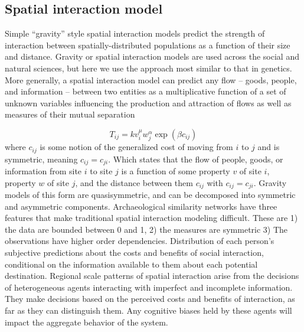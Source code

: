 \documentclass[11pt]{wlscirep}
\begin{document}
\subsection*{Spatial interaction model}
Simple ``gravity'' style spatial interaction models predict the strength of interaction between spatially-distributed populations as a function of their size and distance. Gravity or spatial interaction models are used across the social and natural sciences, but here we use the approach most similar to that in genetics. More generally, a spatial interaction model can predict any flow -- goods, people, and information -- between two entities as a multiplicative function of a set of unknown variables influencing the production and attraction of flows as well as measures of their mutual separation

\begin{equation}
    T_{ij} = k v_i^\mu w_j^\alpha \exp(\beta c_{ij})
\end{equation}
where $c_{ij}$ is some notion of the generalized cost of moving from $i$ to $j$ and is symmetric, meaning $c_{ij} = c_{ji}$. Which states that the flow of people, goods, or information from site $i$ to site $j$ is a function of some property $v$ of site $i$, property $w$ of site $j$, and the distance between them $c_{ij}$ with $c_{ij} = c_{ji}$. Gravity models of this form are quasisymmetric, and can be decomposed into symmetric and asymmetric components. 
Archaeological similarity networks have three features that make traditional spatial interaction modeling difficult. These are 1) the data are bounded between 0 and 1, 2) the measures are symmetric
3) The observations have higher order dependencies. Distribution of each person's subjective predictions about the costs and benefits of social interaction, conditional on the information available to them about each potential destination. Regional scale patterns of spatial interaction arise from the decisions of heterogeneous agents interacting with imperfect and incomplete information. They make decisions based on the perceived costs and benefits of interaction, as far as they can distinguish them. Any cognitive biases held by these agents will impact the aggregate behavior of the system.
\end{document}
